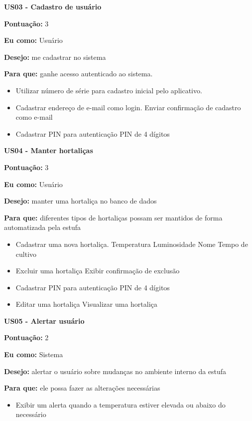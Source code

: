 \textbf{US03 - Cadastro de usuário}

\textbf{Pontuação:} 3

\textbf{Eu como:} Usuário

\textbf{Desejo:} me cadastrar no sistema

\textbf{Para que:} ganhe acesso autenticado ao sistema.

\begin{itemize}
	\item Utilizar número de série para cadastro inicial pelo aplicativo.
	\item Cadastrar endereço de e-mail como login.
	\subitem Enviar confirmação de cadastro como e-mail
	\item Cadastrar PIN para autenticação
	\subitem PIN de 4 dígitos
\end{itemize}

\textbf{US04 - Manter hortaliças}

\textbf{Pontuação:} 3

\textbf{Eu como:} Usuário

\textbf{Desejo:} manter uma hortaliça no banco de dados

\textbf{Para que:} diferentes tipos de hortaliças possam ser mantidos de forma automatizada pela estufa

\begin{itemize}
	\item Cadastrar uma nova hortaliça.
		\subitem Temperatura
		\subitem Luminosidade
		\subitem Nome
		\subitem Tempo de cultivo
	\item Excluir uma hortaliça
	\subitem Exibir confirmação de exclusão
	\item Cadastrar PIN para autenticação
	\subitem PIN de 4 dígitos
	\item Editar uma hortaliça
	\subitem Visualizar uma hortaliça
\end{itemize}

\textbf{US05 - Alertar usuário}

\textbf{Pontuação:} 2

\textbf{Eu como:} Sistema

\textbf{Desejo:} alertar o usuário sobre mudanças no ambiente interno da estufa

\textbf{Para que:} ele possa fazer as alterações necessárias

\begin{itemize}
	\item Exibir um alerta quando a temperatura estiver elevada ou abaixo do necessário
\end{itemize}

